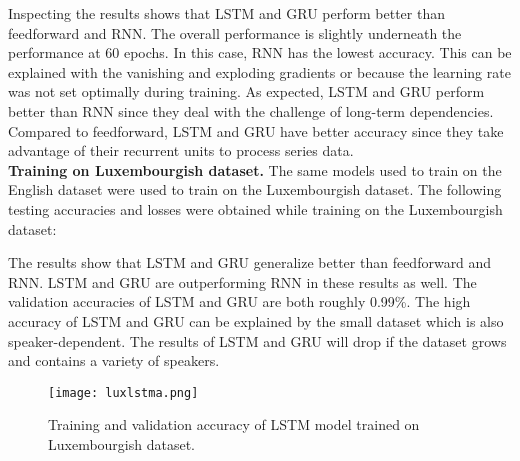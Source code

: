 Inspecting the results shows that LSTM and GRU perform better than feedforward
and RNN. The overall performance is slightly underneath the performance at 60
epochs. In this case, RNN has the lowest accuracy. This can be explained with
the vanishing and exploding gradients or because the learning rate was not set
optimally during training. As expected, LSTM and GRU perform better than RNN
since they deal with the challenge of long-term dependencies. Compared to
feedforward, LSTM and GRU have better accuracy since they take advantage of
their recurrent units to process series data.\\

\textbf{Training on Luxembourgish dataset.} The same models used to train on the
English dataset were used to train on the Luxembourgish dataset. The following
testing accuracies and losses were obtained while training on the Luxembourgish
dataset:

\begin{table}[H]
    \centering
\end{table}

The results show that LSTM and GRU generalize better than feedforward and RNN.
LSTM and GRU are outperforming RNN in these results as well. The validation
accuracies of LSTM and GRU are both roughly 0.99\%. The high accuracy of LSTM
and GRU can be explained by the small dataset which is also speaker-dependent.
The results of LSTM and GRU will drop if the dataset grows and contains a
variety of speakers.\\

\begin{figure}[h]
  \centering
  \texttt{[image: luxlstma.png]}
  \caption{Training and validation accuracy of LSTM model trained on
  Luxembourgish dataset.}
\end{figure}

